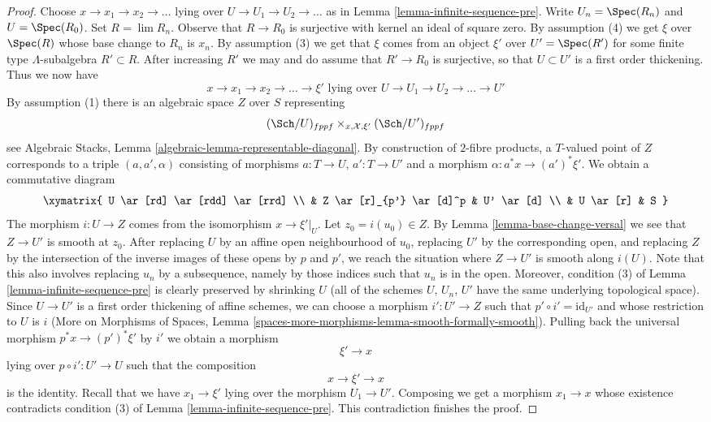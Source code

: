 \begin{proof}
\medskip\noindent
Choose $x \to x_1 \to x_2 \to \ldots$ lying over
$U \to U_1 \to U_2 \to \ldots$ as in Lemma \ref{lemma-infinite-sequence-pre}.
Write $U_n = \Spec(R_n)$ and $U = \Spec(R_0)$.
Set $R = \lim R_n$. Observe that $R \to R_0$ is surjective
with kernel an ideal of square zero. By assumption (4)
we get $\xi$ over $\Spec(R)$ whose base change to $R_n$ is $x_n$.
By assumption (3) we get that $\xi$ comes from an object $\xi'$ over
$U' = \Spec(R')$ for some finite type $\Lambda$-subalgebra
$R' \subset R$. After increasing $R'$ we may and do assume that
$R' \to R_0$ is surjective, so that $U \subset U'$ is a first order thickening.
Thus we now have
$$
x \to x_1 \to x_2 \to \ldots \to \xi'
\text{ lying over }
U \to U_1 \to U_2 \to \ldots \to U'
$$
By assumption (1) there is an algebraic space $Z$ over $S$ representing
$$
(\Sch/U)_{fppf} \times_{x, \mathcal{X}, \xi'} (\Sch/U')_{fppf}
$$
see Algebraic Stacks, Lemma \ref{algebraic-lemma-representable-diagonal}.
By construction of $2$-fibre products, a $T$-valued point of $Z$
corresponds to a triple $(a, a', \alpha)$ consisting of morphisms
$a : T \to U$, $a' : T \to U'$ and a morphism $\alpha : a^*x \to (a')^*\xi'$.
We obtain a commutative diagram
$$
\xymatrix{
U \ar[rd] \ar[rdd] \ar[rrd] \\
& Z \ar[r]_{p'} \ar[d]^p & U' \ar[d] \\
& U \ar[r] & S
}
$$
The morphism $i : U \to Z$ comes from the isomorphism $x \to \xi'|_U$.
Let $z_0 = i(u_0) \in Z$. By Lemma \ref{lemma-base-change-versal}
we see that $Z \to U'$ is smooth at $z_0$. After replacing $U$ by an
affine open neighbourhood of $u_0$, replacing $U'$ by the corresponding
open, and replacing $Z$ by the intersection of the inverse images
of these opens by $p$ and $p'$, we reach the situation where
$Z \to U'$ is smooth along $i(U)$. Note that this
also involves replacing $u_n$ by a subsequence, namely
by those indices such that $u_n$ is in the open. Moreover, condition
(3) of Lemma \ref{lemma-infinite-sequence-pre}
is clearly preserved by shrinking $U$
(all of the schemes $U$, $U_n$, $U'$ have the same underlying
topological space).
Since $U \to U'$ is a first order thickening of affine schemes,
we can choose a morphism $i' : U' \to Z$
such that $p' \circ i' = \text{id}_{U'}$ and
whose restriction to $U$ is $i$
(More on Morphisms of Spaces, Lemma
\ref{spaces-more-morphisms-lemma-smooth-formally-smooth}).
Pulling back the universal morphism
$p^*x \to (p')^*\xi'$ by $i'$ we obtain a morphism
$$
\xi' \to x
$$
lying over $p \circ i' : U' \to U$ such that the composition
$$
x \to \xi' \to x
$$
is the identity. Recall that we have $x_1 \to \xi'$ lying over
the morphism $U_1 \to U'$. Composing we get a morphism
$x_1 \to x$ whose existence contradicts condition
(3) of Lemma \ref{lemma-infinite-sequence-pre}.
This contradiction finishes the proof.
\end{proof}

